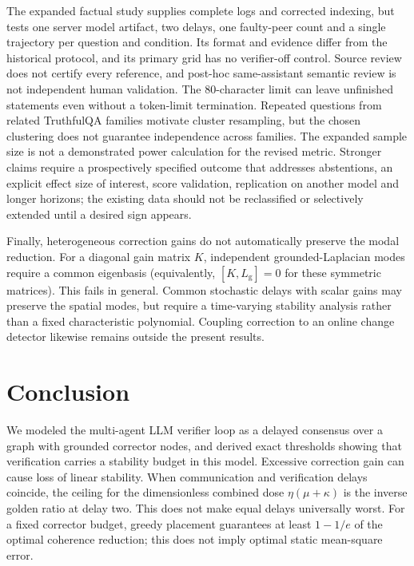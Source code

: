 \documentclass[11pt]{article}
\theoremstyle{definition}
\newcommand{\Lg}{L_{\mathrm g}}
\begin{document}
The expanded factual study supplies complete logs and corrected indexing, but tests one server
model artifact, two delays, one faulty-peer count and a single trajectory per question and condition.
Its format and evidence differ from the historical protocol, and its primary grid has no verifier-off
control. Source review does not certify every reference, and post-hoc same-assistant semantic review
is not independent human validation. The $80$-character limit can leave unfinished statements even
without a token-limit termination. Repeated questions from related TruthfulQA families motivate
cluster resampling, but the chosen clustering does not guarantee independence across families.
The expanded sample size is not a demonstrated power calculation for the revised metric.
Stronger claims require a prospectively specified outcome that addresses abstentions, an explicit
effect size of interest, score validation, replication on another model and longer horizons; the
existing data should not be reclassified or selectively extended until a desired sign appears.

Finally, heterogeneous correction gains do not automatically preserve the modal reduction.
For a diagonal gain matrix $K$, independent grounded-Laplacian modes require a common eigenbasis
(equivalently, $[K,\Lg]=0$ for these symmetric matrices). This fails in general. Common stochastic
delays with scalar gains may preserve the spatial modes, but require a time-varying stability analysis
rather than a fixed characteristic polynomial. Coupling correction to an online change detector
likewise remains outside the present results.

\section{Conclusion}
We modeled the multi-agent LLM verifier loop as a delayed consensus over a graph with grounded
corrector nodes, and derived exact thresholds showing that verification carries a stability
budget in this model. Excessive correction gain can cause loss of linear stability.
When communication and verification delays coincide, the ceiling for the dimensionless combined
dose $\eta(\mu+\kappa)$ is the inverse golden ratio at delay two. This does not make equal delays universally worst. For a fixed corrector budget, greedy placement guarantees at least
$1-1/e$ of the optimal coherence reduction; this does not imply optimal static mean-square error.
\end{document}
